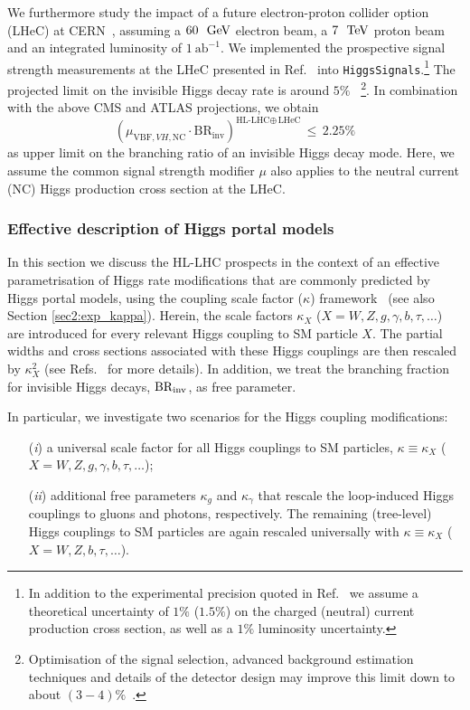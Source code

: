 \documentclass[../report.tex]{subfiles}
\begin{document}
We furthermore study the impact of a future electron-proton collider option (LHeC) at CERN~\cite{AbelleiraFernandez:2012cc,uta,uta2,Zimmermann:2651305}, assuming a $60~\mathrm{~\text{GeV}}$ electron beam, a $7~\mathrm{~\text{TeV}}$ proton beam and an integrated luminosity of $1~\mathrm{ab}^{-1}$. We implemented the prospective signal strength measurements at the LHeC presented in Ref.~\cite{uta} into \texttt{HiggsSignals}.\footnote{In addition to the experimental precision quoted in Ref.~\cite{uta} we assume a theoretical uncertainty of $1\%$ ($1.5\%$) on the charged (neutral) current production cross section, as well as a $1\%$ luminosity uncertainty.} The projected limit on the invisible Higgs decay rate is around $5\%$~\cite{uta,Tang:2015uha,kuzeLHeC,bc1,bc2,uta2} \footnote{Optimisation of the signal selection, advanced background estimation techniques and details of the detector design may improve this limit down to about $(3-4)\%$~\cite{Utacommunications}.}.
In combination with the above CMS and ATLAS projections, we obtain
\begin{equation*}
\left(\mu_{\text{VBF},VH,\text{NC}} \cdot \text{BR}_\text{inv}\right)^{\text{HL-LHC}\oplus\,\text{LHeC}}\,\leq\,2.25\%
\end{equation*}
as upper limit on the branching ratio of an invisible Higgs decay mode. {Here, {we assume} the common signal strength modifier $\mu$ also applies to the neutral current (NC) Higgs production cross section at the LHeC.}


\subsubsection{Effective description of Higgs portal models}
\label{sec6:effC}

In this section we discuss the HL-LHC prospects in the context of an effective parametrisation of Higgs rate modifications that are commonly predicted by Higgs portal models, using the coupling scale factor ($\kappa$) framework~\cite{Heinemeyer:2013tqa} (see also Section \ref{sec2:exp_kappa}).  Herein, the scale factors $\kappa_X$ ($X = W, Z, g, \gamma, b, \tau, \dots$) are introduced for every relevant Higgs coupling to SM particle $X$. The partial widths and cross sections associated with these Higgs couplings are then rescaled by $\kappa^2_X$ (see Refs.~\cite{Heinemeyer:2013tqa,Bechtle:2014ewa} for more details). In addition, we treat the branching fraction for invisible Higgs decays, $\mathrm{BR}_\mathrm{inv}$, as free parameter.

In particular, we investigate two scenarios for the Higgs coupling modifications:
\begin{enumerate}
\item[(\emph{i})] a universal scale factor for all Higgs couplings to SM particles, $\kappa \equiv \kappa_X$ ($X = W, Z, g, \gamma, b, \tau, \dots$);
\item[(\emph{ii})] additional free parameters $\kappa_g$ and $\kappa_\gamma$ that rescale the loop-induced Higgs couplings to gluons and photons, respectively. The remaining (tree-level) Higgs couplings to SM particles are again rescaled universally with $\kappa \equiv  \kappa_X$ ($X = W, Z, b, \tau, \dots$).
\end{enumerate}
\end{document}

